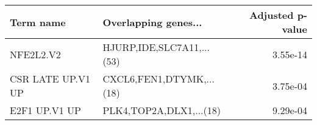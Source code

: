 \begin{tabular}{llr}
\toprule
        Term name &      Overlapping genes... &  Adjusted p-value \\
\midrule
        NFE2L2.V2 & HJURP,IDE,SLC7A11,...(53) &          3.55e-14 \\
CSR LATE UP.V1 UP &  CXCL6,FEN1,DTYMK,...(18) &          3.75e-04 \\
    E2F1 UP.V1 UP &   PLK4,TOP2A,DLX1,...(18) &          9.29e-04 \\
\bottomrule
\end{tabular}
